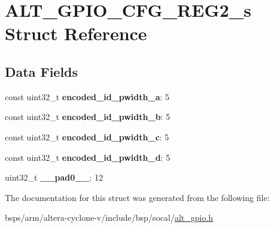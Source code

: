 \hypertarget{structALT__GPIO__CFG__REG2__s}{}\section{A\+L\+T\+\_\+\+G\+P\+I\+O\+\_\+\+C\+F\+G\+\_\+\+R\+E\+G2\+\_\+s Struct Reference}
\label{structALT__GPIO__CFG__REG2__s}
\subsection*{Data Fields}
\begin{DoxyCompactItemize}
\item 
\mbox{\label{structALT__GPIO__CFG__REG2__s_a86155999ab53615f768147c1c2a12484}} 
const uint32\+\_\+t {\bfseries encoded\+\_\+id\+\_\+pwidth\+\_\+a}\+: 5
\item 
\mbox{\label{structALT__GPIO__CFG__REG2__s_a6cf3f8dfef1c3076b3f4f71c3a780581}} 
const uint32\+\_\+t {\bfseries encoded\+\_\+id\+\_\+pwidth\+\_\+b}\+: 5
\item 
\mbox{\label{structALT__GPIO__CFG__REG2__s_a3d793d8534a93d67aef45d41f8f59790}} 
const uint32\+\_\+t {\bfseries encoded\+\_\+id\+\_\+pwidth\+\_\+c}\+: 5
\item 
\mbox{\label{structALT__GPIO__CFG__REG2__s_a65c094c7f3accb63629a6480e0be1f0f}} 
const uint32\+\_\+t {\bfseries encoded\+\_\+id\+\_\+pwidth\+\_\+d}\+: 5
\item 
\mbox{\label{structALT__GPIO__CFG__REG2__s_a9ad0858a04fbce14692045fbbeaf77bb}} 
uint32\+\_\+t {\bfseries \+\_\+\+\_\+pad0\+\_\+\+\_\+}\+: 12
\end{DoxyCompactItemize}


The documentation for this struct was generated from the following file\+:\begin{DoxyCompactItemize}
\item 
bsps/arm/altera-\/cyclone-\/v/include/bsp/socal/\mbox{\hyperlink{alt__gpio_8h}{alt\+\_\+gpio.\+h}}\end{DoxyCompactItemize}
